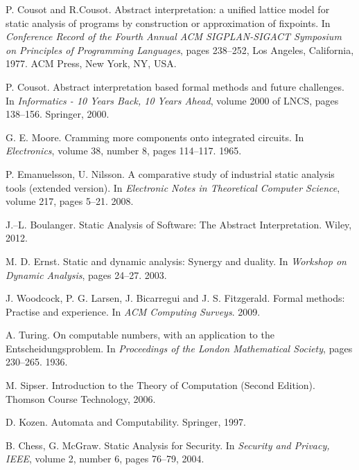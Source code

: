 \documentclass[12pt,final,oneside]{fithesis2}
\begin{document}
\begin{thebibliography}{99}

P{.} Cousot and R{.}Cousot.
\newblock Abstract interpretation: a unified lattice model for static
  analysis of programs by construction or approximation of fixpoints.
\newblock In \emph{Conference Record of the Fourth Annual ACM
  SIGPLAN-SIGACT Symposium on Principles of Programming Languages},
  pages 238--252, Los Angeles, California, 1977. ACM Press, New York,
  NY, USA.

P{.} Cousot.
\newblock Abstract interpretation based formal methods and future
  challenges.
\newblock In \emph{Informatics - 10 Years Back, 10 Years Ahead},
  volume 2000 of LNCS, pages 138--156. Springer, 2000.

G{.} E{.} Moore.
\newblock Cramming more components onto integrated circuits.
\newblock In \emph{Electronics}, volume 38, number 8, pages 114--117. 1965.

P{.} Emanuelsson, U{.} Nilsson.
\newblock A comparative study of industrial static analysis tools (extended
  version).
\newblock In \emph{Electronic Notes in Theoretical Computer Science},
  volume 217, pages 5--21. 2008.

J{.}--L{.} Boulanger.
\newblock Static Analysis of Software: The Abstract Interpretation.
\newblock Wiley, 2012.

M{.} D{.} Ernst.
\newblock Static and dynamic analysis: Synergy and duality.
\newblock In \emph{Workshop on Dynamic Analysis}, pages 24--27. 2003.

J{.} Woodcock, P{.} G{.} Larsen, J{.} Bicarregui and J{.} S{.} Fitzgerald.
\newblock Formal methods: Practise and experience.
\newblock In \emph{ACM Computing Surveys}. 2009.

A{.} Turing.
\newblock On computable numbers, with an application to the
  Entscheidungsproblem.
\newblock In \emph{Proceedings of the London Mathematical Society},
  pages 230--265. 1936.

M{.} Sipser.
\newblock Introduction to the Theory of Computation (Second Edition).
\newblock Thomson Course Technology, 2006.

D{.} Kozen.
\newblock Automata and Computability.
\newblock Springer, 1997.

B{.} Chess, G{.} McGraw.
\newblock Static Analysis for Security.
\newblock In \emph{Security and Privacy, IEEE}, volume 2, number 6,
  pages 76--79, 2004.


\end{thebibliography}
\end{document}

